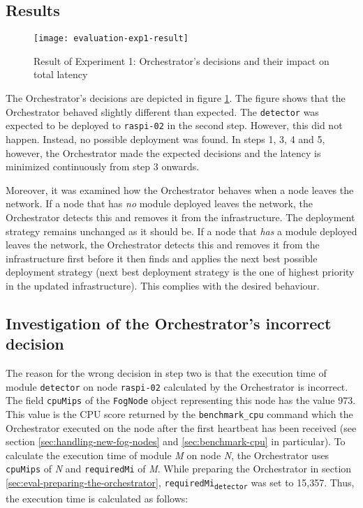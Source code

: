 \subsection*{Results}

\begin{figure}[htb]
    \centering
    \texttt{[image: evaluation-exp1-result]}
    \caption{Result of Experiment 1: Orchestrator's decisions and their impact on total latency}
    \label{fig:evaluation-exp1-results}
\end{figure}

The Orchestrator's decisions are depicted in figure \ref{fig:evaluation-exp1-results}.
The figure shows that the Orchestrator behaved slightly different than expected.
The \texttt{detector} was expected to be deployed to \texttt{raspi-02} in the second step. However, this did not happen.
Instead, no possible deployment was found.
In steps 1, 3, 4 and 5, however, the Orchestrator made the expected decisions and the latency is minimized continuously from step 3 onwards.

Moreover, it was examined how the Orchestrator behaves when a node leaves the network.
If a node that has \textit{no} module deployed leaves the network, the Orchestrator detects this and removes it from the infrastructure.
The deployment strategy remains unchanged as it should be.
If a node that \textit{has} a module deployed leaves the network, the Orchestrator detects this and removes it from the infrastructure first before it then finds and applies the next best possible deployment strategy (next best deployment strategy is the one of highest priority in the updated infrastructure).
This complies with the desired behaviour.

\subsection*{Investigation of the Orchestrator's incorrect decision\label{sec:eval-investigation-cpu}}

The reason for the wrong decision in step two is that the execution time of module \texttt{detector} on node \texttt{raspi-02} calculated by the Orchestrator is incorrect.
The field \texttt{cpuMips} of the \texttt{FogNode} object representing this node has the value 973.
This value is the CPU score returned by the \texttt{benchmark\_cpu} command which the Orchestrator executed on the node after the first heartbeat has been received (see section \ref{sec:handling-new-fog-nodes} and \ref{sec:benchmark-cpu} in particular).
To calculate the execution time of module \textit{M} on node \textit{N}, the Orchestrator uses \texttt{cpuMips} of \textit{N} and \texttt{requiredMi} of \textit{M}.
While preparing the Orchestrator in section \ref{sec:eval-preparing-the-orchestrator}, \texttt{requiredMi\textsubscript{detector}} was set to 15,357. Thus, the execution time is calculated as follows:

